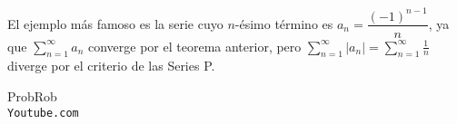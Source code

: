 \documentclass[12pt]{article}							    %
\begin{document}
El ejemplo más famoso es la serie cuyo $n$-ésimo término es $a_n=\dfrac{(-1)^{n-1}}{n}$, ya que $\sum_{n=1}^{\infty}a_n$ converge por el teorema anterior, pero $\sum_{n=1}^{\infty} |a_n| = \sum_{n=1}^{\infty} \frac{1}{n}$ diverge por el criterio de las Series P.



\clearpage

	\begin{thebibliography}{9}

		ProbRob
		\\\texttt{Youtube.com}


	 

\end{thebibliography}
\end{document}
